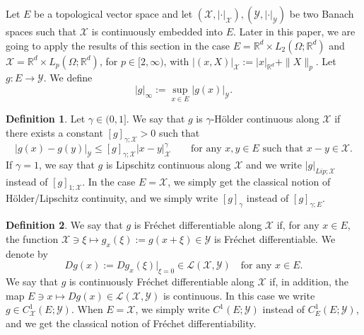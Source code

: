 \documentclass[10pt, a4paper]{article} %
\newcommand{\R}{\mathbb{R}}
\theoremstyle{definition}
\newtheorem{defn}{Definition}[section]
\theoremstyle{plain}
\begin{document}
Let $E$ be a topological vector space and let $(\mathcal{X}, |\cdot|_\mathcal{X}),(\mathcal{Y}, |\cdot|_\mathcal{Y})$ be two Banach spaces such that $\mathcal{X}$ is continuously embedded into $E$. 
Later in this paper, we are going to apply the results of this section in the case $E = \R^d \times L_2(\Omega;\R^d)$ and $\mathcal{X}=\R^d \times L_p(\Omega;\R^d)$, for $p \in [2,\infty)$, with $|(x,X)|_\mathcal{X} := |x|_{\R^d} + \|X\|_p$. Let $g : E \to \mathcal{Y}$. We define \begin{equation*}
    |g|_\infty := \sup_{x \in E} |g(x)|_{\mathcal{Y}} .
\end{equation*}

\begin{defn} \label{def:HoldercontinuityalongsubBanachspaces}
    Let $\gamma \in (0,1]$. We say that $g$ is $\gamma$-H\"older continuous along $\mathcal{X}$ if there exists a constant $[g]_{\gamma;\mathcal{X}} >0$ such that \begin{equation*}
        |g(x) - g(y)|_\mathcal{Y} \le [g]_{\gamma;\mathcal{X}} |x-y|^\gamma_\mathcal{X} \qquad \text{for any $x,y \in E$ such that $x-y \in \mathcal{X}$} .
    \end{equation*}
    If $\gamma=1$, we say that $g$ is Lipschitz continuous along $\mathcal{X}$ and we write $|g|_{Lip;\mathcal{X}}$ instead of $[g]_{1;\mathcal{X}}$.
    In the case $E = \mathcal{X}$, we simply get the classical notion of H\"older/Lipschitz continuity, and we simply write $[g]_{\gamma}$ instead of $[g]_{\gamma;E}$. 
\end{defn}

\begin{defn} \label{def:FrechetdifferentiabilityalongsubBanachspaces}
    We say that $g$ is Fréchet differentiable along $\mathcal{X}$ if, for any $x \in E$, the function $\mathcal{X} \ni \xi \mapsto g_x(\xi) := g(x+\xi) \in \mathcal{Y}$ is Fréchet differentiable. We denote by \begin{equation*}
        Dg(x) := D g_x (\xi) \big|_{\xi = 0} \in \mathscr{L}(\mathcal{X},\mathcal{Y})  \quad \text{for any $x \in E$} .
    \end{equation*}
    We say that $g$ is continuously Fréchet differentiable along $\mathcal{X}$ if, in addition, the map $E \ni x \mapsto Dg (x) \in \mathscr{L}(\mathcal{X},\mathcal{Y})$ is continuous. In this case we write $g \in C^1_{\mathcal{X}}(E;\mathcal{Y})$. 
    When $E = \mathcal{X}$, we simply write $C^1(E;\mathcal{Y})$ instead of $C^1_E(E;\mathcal{Y})$, and we get the classical notion of Fréchet differentiability.  
\end{defn}
\end{document}
